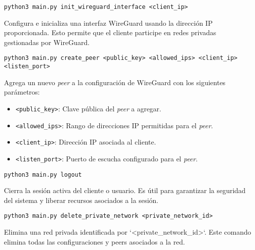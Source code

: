    
    
    \begin{Verbatim}[breaklines=true]
    python3 main.py init_wireguard_interface <client_ip>
    \end{Verbatim} 
    Configura e inicializa una interfaz WireGuard usando la dirección IP proporcionada. Esto permite que el cliente participe en redes privadas gestionadas por WireGuard.
    
   
    
    \begin{Verbatim}[breaklines=true]
        python3 main.py create_peer <public_key> <allowed_ips> <client_ip> <listen_port>
    \end{Verbatim}
        
    Agrega un nuevo \textit{peer} a la configuración de WireGuard con los siguientes parámetros:  
        \begin{itemize}
            \item \texttt{<public\_key>}: Clave pública del \textit{peer} a agregar.
            \item \texttt{<allowed\_ips>}: Rango de direcciones IP permitidas para el \textit{peer}.
            \item \texttt{<client\_ip>}: Dirección IP asociada al cliente.
            \item \texttt{<listen\_port>}: Puerto de escucha configurado para el \textit{peer}.
        \end{itemize}
        
   
    
    \begin{Verbatim}[breaklines=true]
    python3 main.py logout
    \end{Verbatim} 
    Cierra la sesión activa del cliente o usuario. Es útil para garantizar la seguridad del sistema y liberar recursos asociados a la sesión.
    
   
    
    
    \begin{Verbatim}[breaklines=true]
    python3 main.py delete_private_network <private_network_id>
    \end{Verbatim} 
    Elimina una red privada identificada por `<private\_network\_id>`. Este comando elimina todas las configuraciones y peers asociados a la red.
    
